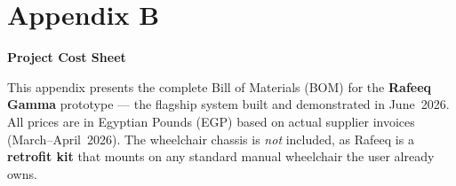 \documentclass[12pt,a4paper]{report}
\begin{document}
%


\newcommand{\Hcell}[1]{%
  \cellcolor{HeaderBg}\color{white}\textbf{#1}}

\newcommand{\Scell}[1]{%
  \cellcolor{SubBg}\textbf{\color{RafeeqBlue}#1}}

\newcommand{\BOMsection}[2]{%
  \vspace{0.9em}
  {\large\bfseries\color{RafeeqBlue} #1\quad #2}
  \vspace{0.3em}}

\chapter*{Appendix B}

{\LARGE\bfseries Project Cost Sheet}
\vspace{0.6em}

\noindent
This appendix presents the complete Bill of Materials (BOM) for the
\textbf{Rafeeq Gamma} prototype — the flagship system built and
demonstrated in June~2026. All prices are in Egyptian Pounds (EGP)
based on actual supplier invoices (March--April~2026). The wheelchair
chassis is \emph{not} included, as Rafeeq is a \textbf{retrofit kit}
that mounts on any standard manual wheelchair the user already owns.

\vspace{1em}
\end{document}
